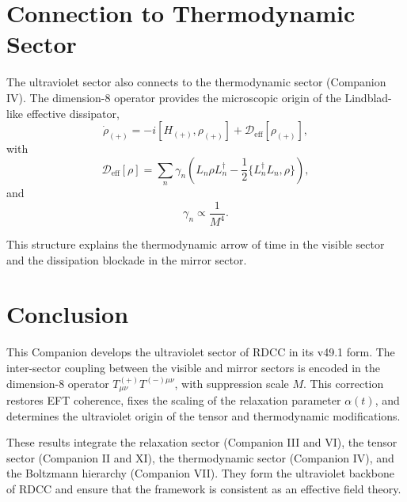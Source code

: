 \documentclass[11pt,a4paper]{article}
\begin{document}
\section[Connection to Thermodynamic Sector]{Connection to Thermodynamic Sector}

The ultraviolet sector also connects to the thermodynamic sector (Companion IV).
The dimension-8 operator provides the microscopic origin of the Lindblad-like
effective dissipator,
\begin{equation}
\dot{\rho}_{(+)} =
- i [H_{(+)}, \rho_{(+)}]
+ \mathcal{D}_{\mathrm{eff}}[\rho_{(+)}],
\end{equation}
with
\begin{equation}
\mathcal{D}_{\mathrm{eff}}[\rho]
=
\sum_{n} \gamma_n
\left(
L_n \rho L_n^\dagger
- \frac{1}{2} \{ L_n^\dagger L_n, \rho \}
\right),
\end{equation}
and
\begin{equation}
\gamma_n \propto \frac{1}{M^4}.
\end{equation}

This structure explains the thermodynamic arrow of time in the visible sector
and the dissipation blockade in the mirror sector.

\section{Conclusion}

This Companion develops the ultraviolet sector of RDCC in its v49.1 form. The
inter-sector coupling between the visible and mirror sectors is encoded in the
dimension-8 operator $T^{(+)}_{\mu\nu}T^{(-)\mu\nu}$, with suppression scale
$M$. This correction restores EFT coherence, fixes the scaling of the
relaxation parameter $\alpha(t)$, and determines the ultraviolet origin of the
tensor and thermodynamic modifications.

These results integrate the relaxation sector (Companion III and VI), the
tensor sector (Companion II and XI), the thermodynamic sector (Companion IV),
and the Boltzmann hierarchy (Companion VII). They form the ultraviolet
backbone of RDCC and ensure that the framework is consistent as an effective
field theory.
\end{document}
